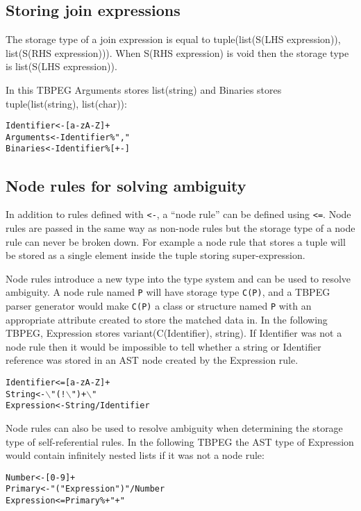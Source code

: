 \documentclass[a4paper,11pt]{article}
\begin{document}
\subsection{Storing join expressions}
The storage type of a join expression is equal to tuple(list(S(LHS expression)), list(S(RHS expression))). When S(RHS expression) is void then the storage type is list(S(LHS expression)).

In this TBPEG Arguments stores list(string) and Binaries stores tuple(list(string), list(char)):
\begin{alltt}
    Identifier <- [a-zA-Z]+
    Arguments  <- Identifier \% ","
    Binaries   <- Identifier \% [+-]
\end{alltt}

\subsection{Node rules for solving ambiguity}
In addition to rules defined with \verb+<-+, a ``node rule'' can be defined using \verb+<=+.
Node rules are passed in the same way as non-node rules but the storage type of a node rule can never be broken down.
For example a node rule that stores a tuple will be stored as a single element inside the tuple storing super-expression.

Node rules introduce a new type into the type system and can be used to resolve ambiguity.
A node rule named \verb+P+ will have storage type \verb+C(P)+, and a TBPEG parser generator would make \verb+C(P)+ a class or structure named \verb+P+ with an appropriate attribute created to store the matched data in.
In the following TBPEG, Expression stores variant(C(Identifier), string).
If Identifier was not a node rule then it would be impossible to tell whether a string or Identifier reference was stored in an AST node created by the Expression rule.
\begin{alltt}
    Identifier   <= [a-zA-Z]+
    String       <- \(\backslash\)"  (! \(\backslash\)")+ \(\backslash\)"
    Expression   <- String / Identifier
\end{alltt}

Node rules can also be used to resolve ambiguity when determining the storage type of self-referential rules.
In the following TBPEG the AST type of Expression would contain infinitely nested lists if it was not a node rule:
\begin{alltt}
    Number     <- [0-9]+
    Primary    <- "(" Expression ")" / Number
    Expression <= Primary \%+ "+"
\end{alltt}
\end{document}
